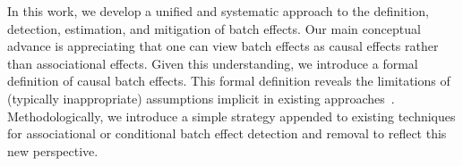 % 
% 
In this work, we develop a unified and systematic approach to the definition, detection, estimation, and mitigation of  batch effects. Our main conceptual advance is appreciating that one can view batch effects as causal effects rather than associational effects.  Given this understanding, we introduce a formal definition of causal batch effects. This formal definition reveals the limitations of (typically inappropriate) assumptions implicit in existing approaches~\cite{Rosenbaum1983Apr,Rosenbaum1985,Stuart2010Feb}. Methodologically, we introduce a simple strategy appended to existing techniques for associational or conditional batch effect detection and removal to reflect this new perspective. 

